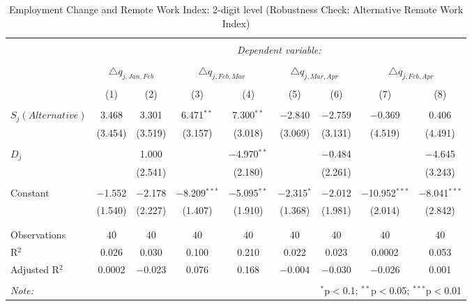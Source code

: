 
\begin{table}[!htbp] \centering 
  \caption{Employment Change and Remote Work Index: 2-digit level (Robustness Check: Alternative Remote Work Index)} 
  \label{tab:regression_dynamics_2digit_alternative} 
\footnotesize 
\begin{tabular}{@{\extracolsep{5pt}}lcccccccc} 
\\[-1.8ex]\hline 
\hline \\[-1.8ex] 
 & \multicolumn{8}{c}{\textit{Dependent variable:}} \\ 
\cline{2-9} 
\\[-1.8ex] & \multicolumn{2}{c}{$\triangle q_{j,Jan,Feb}$} & \multicolumn{2}{c}{$\triangle q_{j,Feb,Mar}$} & \multicolumn{2}{c}{$\triangle q_{j,Mar,Apr}$} & \multicolumn{2}{c}{$\triangle q_{j,Feb,Apr}$} \\ 
\\[-1.8ex] & (1) & (2) & (3) & (4) & (5) & (6) & (7) & (8)\\ 
\hline \\[-1.8ex] 
 $S_{j} (Alternative)$ & 3.468 & 3.301 & 6.471$^{**}$ & 7.300$^{**}$ & $-$2.840 & $-$2.759 & $-$0.369 & 0.406 \\ 
  & (3.454) & (3.519) & (3.157) & (3.018) & (3.069) & (3.131) & (4.519) & (4.491) \\ 
  & & & & & & & & \\ 
 $D_{j}$ &  & 1.000 &  & $-$4.970$^{**}$ &  & $-$0.484 &  & $-$4.645 \\ 
  &  & (2.541) &  & (2.180) &  & (2.261) &  & (3.243) \\ 
  & & & & & & & & \\ 
 Constant & $-$1.552 & $-$2.178 & $-$8.209$^{***}$ & $-$5.095$^{**}$ & $-$2.315$^{*}$ & $-$2.012 & $-$10.952$^{***}$ & $-$8.041$^{***}$ \\ 
  & (1.540) & (2.227) & (1.407) & (1.910) & (1.368) & (1.981) & (2.014) & (2.842) \\ 
  & & & & & & & & \\ 
\hline \\[-1.8ex] 
Observations & 40 & 40 & 40 & 40 & 40 & 40 & 40 & 40 \\ 
R$^{2}$ & 0.026 & 0.030 & 0.100 & 0.210 & 0.022 & 0.023 & 0.0002 & 0.053 \\ 
Adjusted R$^{2}$ & 0.0002 & $-$0.023 & 0.076 & 0.168 & $-$0.004 & $-$0.030 & $-$0.026 & 0.001 \\ 
\hline 
\hline \\[-1.8ex] 
\textit{Note:}  & \multicolumn{8}{r}{$^{*}$p$<$0.1; $^{**}$p$<$0.05; $^{***}$p$<$0.01} \\ 
\end{tabular} 
\end{table} 

